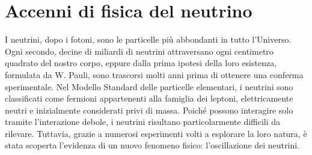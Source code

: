 \chapter{Accenni di fisica del neutrino}
\label{cap:Neutrino}
I neutrini, dopo i fotoni, sono le particelle più abbondanti in tutto l'Universo. Ogni secondo, decine di miliardi di neutrini attraversano ogni centimetro quadrato del nostro corpo, eppure dalla prima ipotesi della loro esistenza, formulata da W. Pauli, sono trascorsi molti anni prima di ottenere una conferma sperimentale. Nel Modello Standard delle particelle elementari, i neutrini sono classificati come fermioni appartenenti alla famiglia dei leptoni, elettricamente neutri e inizialmente considerati privi di massa. Poiché possono interagire solo tramite l'interazione debole, i neutrini risultano particolarmente difficili da rilevare. Tuttavia, grazie a numerosi esperimenti volti a esplorare la loro natura, è stata scoperta l'evidenza di un nuovo fenomeno fisico: l'oscillazione dei neutrini.%

